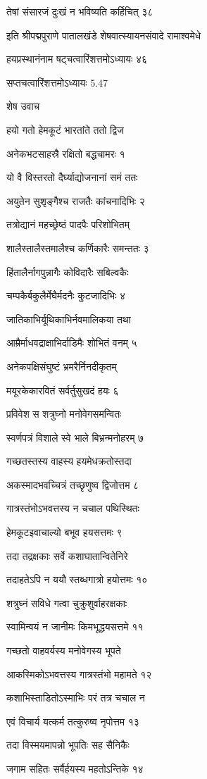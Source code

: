 तेषां संसारजं दुःखं न भविष्यति कर्हिचित् ३८

इति श्रीपद्मपुराणे पातालखंडे शेषवात्स्यायनसंवादे रामाश्वमेधे

हयप्रस्थानंनाम षट्चत्वारिंशत्तमोऽध्यायः ४६

सप्तचत्वारिंशत्तमोऽध्यायः 5.47

शेष उवाच

हयो गतो हेमकूटं भारतांते ततो द्विज

अनेकभटसाहस्रै रक्षितो बद्धचामरः १

यो वै विस्तरतो दैर्घ्याद्योजनानां समं ततः

अयुतेन सुशृङ्गैश्च राजतैः कांचनादिभिः २

तत्रोद्यानं महच्छ्रेष्ठं पादपैः परिशोभितम्

शालैस्तालैस्तमालैश्च कर्णिकारैः समन्ततः ३

हिंतालैर्नागपुन्नागैः कोविदारैः सबिल्वकैः

चम्पकैर्बकुलैर्मेघैर्मदनैः कुटजादिभिः ४

जातिकाभिर्यूथिकाभिर्नवमालिकया तथा

आम्रैर्माधवद्राक्षाभिर्दाडिमैः शोभितं वनम् ५

अनेकपक्षिसंघुष्टं भ्रमरैर्निनदीकृतम्

मयूरकेकारवितं सर्वर्तुसुखदं हयः ६

प्रविवेश स शत्रुघ्नो मनोवेगसमन्वितः

स्वर्णपत्रं विशाले स्वे भाले बिभ्रन्मनोहरम् ७

गच्छतस्तस्य वाहस्य हयमेधक्रतोस्तदा

अकस्मादभवच्चित्रं तच्छृणुष्व द्विजोत्तम ८

गात्रस्तंभोऽभवत्तस्य न चचाल पथिस्थितः

हेमकूटइवाचाल्यो बभूव हयसत्तमः ९

तदा तद्रक्षकाः सर्वे कशाघातान्वितेनिरे

तदाहतेऽपि न ययौ स्तब्धगात्रो हयोत्तमः १०

शत्रुघ्नं सविधे गत्वा चुक्रुशुर्वाहरक्षकाः

स्वामिन्वयं न जानीमः किमभूद्धयसत्तमे ११

गच्छतो वाहवर्यस्य मनोवेगस्य भूपते

आकस्मिकोऽभवत्तस्य गात्रस्तंभो महामते १२

कशाभिस्ताडितोऽस्माभिः परं तत्र चचाल न

एवं विचार्य यत्कर्म तत्कुरुष्व नृपोत्तम १३

तदा विस्मयमापन्नो भूपतिः सह सैनिकैः

जगाम सहितः सर्वैर्हयस्य महतोऽन्तिके १४

